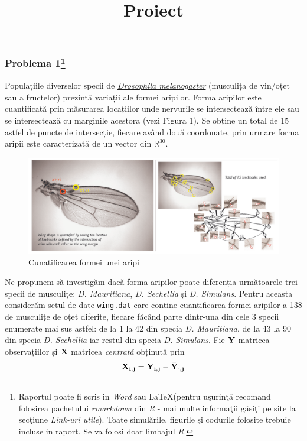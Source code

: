 \documentclass[]{article}
\title{Proiect}
\author{}
\date{}
\let\rmarkdownfootnote\footnote%
\def\footnote{\protect\rmarkdownfootnote}
\def\RR{{\mathbb R}}
\begin{document}
\maketitle

\thispagestyle{fancy}

\subsubsection[Problema 1]{\texorpdfstring{Problema 1\footnote{Raportul
  poate fi scris in \emph{Word} sau \LaTeX (pentru u\c surin\c t\u a
  recomand folosirea pachetului \emph{rmarkdown} din \emph{R} - mai
  multe informa\c tii g\u asi\c ti pe site la sec\c tiune \emph{Link-uri
  utile}). Toate simul\u arile, figurile \c si codurile folosite trebuie
  incluse in raport. Se va folosi doar limbajul \emph{R}.}}{Problema 1}}\label{problema-1}

Populațiile diverselor specii de
\href{https://en.wikipedia.org/wiki/Drosophila_melanogaster}{\emph{Drosophila
melanogaster}} (musculița de vin/oțet sau a fructelor) prezintă variații
ale formei aripilor. Forma aripilor este cuantificată prin măsurarea
locațiilor unde nervurile se intersectează între ele sau se
intersectează cu marginile acestora (vezi Figura 1). Se obține un total
de 15 astfel de puncte de intersecție, fiecare având două coordonate,
prin urmare forma aripii este caracterizată de un vector din
\(\RR^{30}\).

\begin{figure}[htbp]
\centering
\includegraphics{Figs/Wing.png}
\caption{Cunatificarea formei unei aripi}
\end{figure}

Ne propunem să investigăm dacă forma aripilor poate diferenția
următoarele trei specii de musculițe: \emph{D. Mauritiana}, \emph{D.
Sechellia} și \emph{D. Simulans}. Pentru aceasta considerăm setul de
date \href{Data/wing.dat}{\texttt{wing.dat}} care conține cuantificarea
formei aripilor a 138 de musculițe de oțet diferite, fiecare făcând
parte dintr-una din cele 3 specii enumerate mai sus astfel: de la 1 la
42 din specia \emph{D. Mauritiana}, de la 43 la 90 din specia \emph{D.
Sechellia} iar restul din specia \emph{D. Simulans}. Fie \(\bf{Y}\)
matricea observațiilor și \(\bf{X}\) matricea \emph{centrată} obținută
prin \[
\bf{X}_{i,j} = \bf{Y}_{i,j}-\bar{\bf{Y}}_{\cdot, j}
\]
\end{document}
